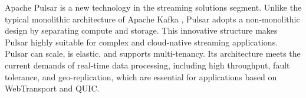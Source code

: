 Apache Pulsar is a new technology in the streaming solutions segment. Unlike the typical monolithic architecture of Apache Kafka \cite{kreps2011}, Pulsar adopts a non-monolithic design by separating compute and storage. This innovative structure makes Pulsar highly suitable for complex and cloud-native streaming applications. Pulsar can scale, is elastic, and supports multi-tenancy. Its architecture meets the current demands of real-time data processing, including high throughput, fault tolerance, and geo-replication, which are essential for applications based on WebTransport and QUIC.

